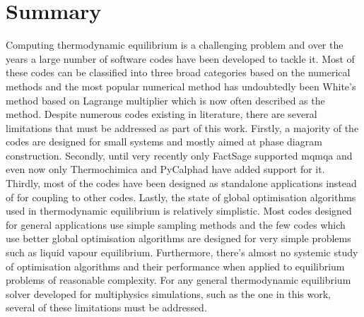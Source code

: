 \section{Summary}
    Computing thermodynamic equilibrium is a challenging problem and over the years a large number of software codes have been developed to tackle it. Most of these codes can be classified into three broad categories based on the numerical methods and the most popular numerical method has undoubtedly been White's method based on Lagrange multiplier which is now often described as the  method. Despite numerous codes existing in literature, there are several limitations that must be addressed as part of this work. Firstly, a majority of the codes are designed for small systems and mostly aimed at phase diagram construction. Secondly, until very recently only FactSage supported \gls{mqmqa} and even now only Thermochimica and PyCalphad have added support for it. Thirdly, most of the codes have been designed as standalone applications instead of for coupling to other codes. Lastly, the state of global optimisation algorithms used in thermodynamic equilibrium is relatively simplistic. Most codes designed for general applications use simple sampling methods and the few codes which use better global optimisation algorithms are designed for very simple problems such as liquid vapour equilibrium. Furthermore, there's almost no systemic study of optimisation algorithms and their performance when applied to equilibrium problems of reasonable complexity. For any general thermodynamic equilibrium solver developed for multiphysics simulations, such as the one in this work, several of these limitations must be addressed. 